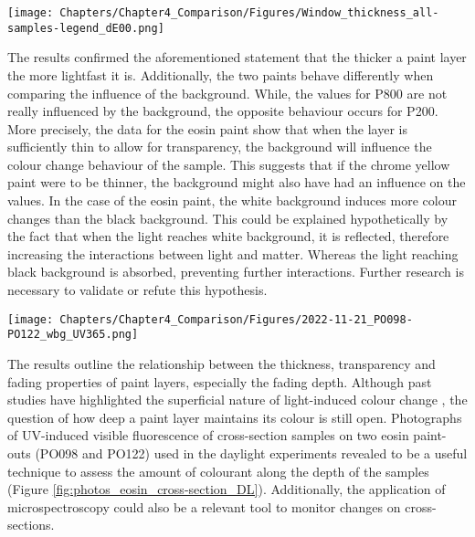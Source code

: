 \begin{figure*}[!h]
\centering
\texttt{[image: Chapters/Chapter4\_Comparison/Figures/Window\_thickness\_all-samples-legend\_dE00.png]}
\caption[\hspace{0.3cm}Daylight samples - Film thickness]{Influence of the film thickness on the \dEOO curves for two paints in the daylight experiments: (a) paint P200 ; (b) paint P800.}
\label{fig:DL_thickness_dE}
\end{figure*}


The results confirmed the aforementioned statement that the thicker a paint layer the more lightfast it is. Additionally, the two paints behave differently when comparing the influence of the background. While, the \dEOO values for P800 are not really influenced by the background, the opposite behaviour occurs for P200. More precisely, the data for the eosin paint show that when the layer is sufficiently thin to allow for transparency, the background will influence the colour change behaviour of the sample. This suggests that if the chrome yellow paint were to be thinner, the background might also have had an influence on the \dEOO values. In the case of the eosin paint, the white background induces more colour changes than the black background. This could be explained hypothetically by the fact that when the light reaches white background, it is reflected, therefore increasing the interactions between light and matter. Whereas the light reaching black background is absorbed, preventing further interactions. Further research is necessary to validate or refute this hypothesis.\\

\begin{figure*}[!h]
\centering
\texttt{[image: Chapters/Chapter4\_Comparison/Figures/2022-11-21\_PO098-PO122\_wbg\_UV365.png]}
\caption[\hspace{0.3cm}Photographs of eosin cross-sections]{UV-induced visible fluorescence photographs taken on two eosin paint samples exposed to daylight: (a) PO098 ; (b) PO122.}
\label{fig:photos_eosin_cross-section_DL}
\end{figure*}

The results outline the relationship between the thickness, transparency and fading properties of paint layers, especially the fading depth. Although past studies have highlighted the superficial nature of light-induced colour change \citep[39]{johnston-feller_reflections_1986}, the question of how deep a paint layer maintains its colour is still open. Photographs of UV-induced visible fluorescence of cross-section samples on two eosin paint-outs (PO098 and PO122) used in the daylight experiments revealed to be a useful technique to assess the amount of colourant along the depth of the samples (Figure \ref{fig:photos_eosin_cross-section_DL}). Additionally, the application of microspectroscopy could also be a relevant tool to monitor changes on cross-sections. 


